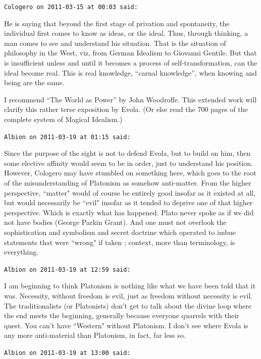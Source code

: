\begin{footnotesize}
\begin{sffamily}
\hfill

\texttt{Cologero on 2011-03-15 at 00:03 said:}

He is saying that beyond the first stage of privation and spontaneity, the individual first comes to know as ideas, or the ideal. Thus, through thinking, a man comes to see and understand his situation. That is the situation of philosophy in the West, viz, from German Idealism to Giovanni Gentile. But that is insufficient unless and until it becomes a process of self-transformation, can the ideal become real. This is real knowledge, ``carnal knowledge'', when knowing and being are the same.

I recommend ``The World as Power'' by John Woodroffe. This extended work will clarify this rather terse exposition by Evola. (Or else read the 700 pages of the complete system of Magical Idealism.)

\hfill


\texttt{Albion on 2011-03-19 at 01:15 said: }

Since the purpose of the sight is not to defend Evola, but to build on him, then some elective affinity would seem to be in order, just to understand his position. However, Cologero may have stumbled on something here, which goes to the root of the misunderstanding of Platonism as somehow anti-matter. From the higher perspective, ``matter" would of course be entirely good insofar as it existed at all, but would necessarily be ``evil" insofar as it tended to deprive one of that higher perspective. Which is exactly what has happened. Plato never spoke as if we did not have bodies (George Parkin Grant). And one must not overlook the sophistication and symbolism and secret doctrine which operated to imbue statements that were ``wrong" if taken ; context, more than terminology, is everything.


\hfill

\texttt{Albion on 2011-03-19 at 12:59 said: }

I am beginning to think Platonism is nothing like what we have been told that it was. Necessity, without freedom is evil, just as freedom without necessity is evil. The traditionalists (or Platonists) don't get to talk about the divine loop where the end meets the beginning, generally because everyone quarrels with their quest. You can't have ``Western" without Platonism. I don't see where Evola is any more anti-material than Platonism, in fact, far less so.


\hfill

\texttt{Albion on 2011-03-19 at 13:00 said: }


\end{sffamily}
\end{footnotesize}

